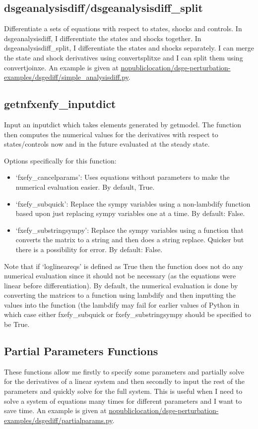 \documentclass{article}
\theoremstyle{definition}
\begin{document}
\subsection{dsgeanalysisdiff/dsgeanalysisdiff\_split}
Differentiate a sets of equations with respect to states, shocks and controls. In dsgeanalysisdiff, I differentiate the states and shocks together. In dsgeanalysisdiff\_split, I differentiate the states and shocks separately. I can merge the state and shock derivatives using convertsplitxe and I can split them using convertjoinxe. An example is given at \url{nopubliclocation/dsge-perturbation-examples/dsgediff/simple_analysisdiff.py}.

\subsection{getnfxenfy\_inputdict}
Input an inputdict which takes elements generated by getmodel. The function then computes the numerical values for the derivatives with respect to states/controls now and in the future evaluated at the steady state.

Options specifically for this function:
\begin{itemize}
    \item `fxefy\_cancelparams': Uses equations without parameters to make the numerical evaluation easier. By default, True.
    \item `fxefy\_subquick': Replace the sympy variables using a non-lambdify function based upon just replacing sympy variables one at a time. By default: False.
    \item `fxefy\_substringsympy': Replace the sympy variables using a function that converts the matrix to a string and then does a string replace. Quicker but there is a possibility for error. By default: False.
\end{itemize}

Note that if `loglineareqs' is defined as True then the function does not do any numerical evaluation since it should not be necessary (as the equations were linear before differentiation). By default, the numerical evaluation is done by converting the matrices to a function using lambdify and then inputting the values into the function (the lambdify may fail for earlier values of Python in which case either fxefy\_subquick or fxefy\_substringsympy should be specified to be True.

\subsection{Partial Parameters Functions}
These functions allow me firstly to specify some parameters and partially solve for the derivatives of a linear system and then secondly to input the rest of the parameters and quickly solve for the full system. This is useful when I need to solve a system of equations many times for different parameters and I want to save time. An example is given at \url{nopubliclocation/dsge-perturbation-examples/dsgediff/partialparams.py}.
\end{document}
